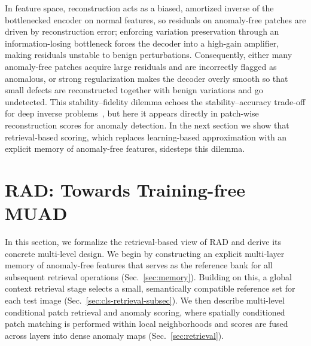 \documentclass{article}
\theoremstyle{plain}
\theoremstyle{definition}
\theoremstyle{remark}
\begin{document}
In feature space, reconstruction acts as a biased, amortized inverse of the bottlenecked encoder on normal features, so residuals on anomaly-free patches are driven by reconstruction error; enforcing variation preservation through an information-losing bottleneck forces the decoder into a high-gain amplifier, making residuals unstable to benign perturbations.
Consequently, either many anomaly-free patches acquire large residuals and are incorrectly flagged as anomalous, or strong regularization makes the decoder overly smooth so that small defects are reconstructed together with benign variations and go undetected. This stability--fidelity dilemma echoes the stability--accuracy trade-off for deep inverse problems~\cite{colbrook2022difficulty}, but here it appears directly in patch-wise reconstruction scores for anomaly detection. In the next section we show that retrieval-based scoring, which replaces learning-based approximation with an explicit memory of anomaly-free features, sidesteps this dilemma.



\section{RAD: Towards Training-free MUAD}
\label{sec:evoad}
In this section, we formalize the retrieval-based view of RAD and derive its concrete multi-level design. We begin by constructing an explicit multi-layer memory of anomaly-free features that serves as the reference bank for all subsequent retrieval operations (Sec.~\ref{sec:memory}). Building on this, a global context retrieval stage selects a small, semantically compatible reference set for each test image (Sec.~\ref{sec:cls-retrieval-subsec}). We then describe multi-level conditional patch retrieval and anomaly scoring, where spatially conditioned patch matching is performed within local neighborhoods and scores are fused across layers into dense anomaly maps (Sec.~\ref{sec:retrieval}).



\end{document}
